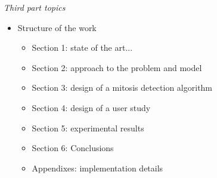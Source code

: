 \emph{Third part topics}

\begin{itemize}
\item Structure of the work
	\begin{itemize}
	\item Section 1: state of the art...
	\item Section 2: approach to the problem and model
	\item Section 3: design of a mitosis detection algorithm
	\item Section 4: design of a user study
	\item Section 5: experimental results
	\item Section 6: Conclusions
	\item Appendixes: implementation details
	\end{itemize}
\end{itemize}







 

